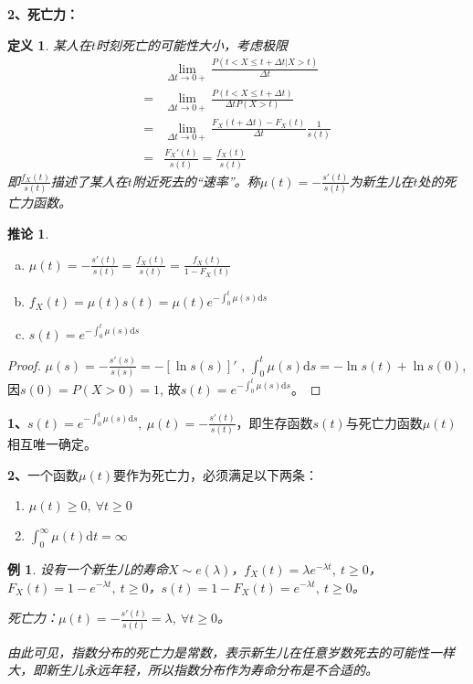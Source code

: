 \documentclass[12pt, a4paper, oneside]{ctexbook}
\newtheorem{definition}[theorem]{定义}
\newtheorem{corollary}[theorem]{推论}
\newtheorem{example}[theorem]{例}
\begin{document}
\textbf{2、死亡力：}
\begin{definition}
    某人在$t$时刻死亡的可能性大小，考虑极限
    \begin{equation*}
        \begin{aligned}
              & \lim_{\Delta t\to0+}\frac{P(t<X\leqslant t+\Delta t|X>t)}{\Delta t}         \\
            = & \lim_{\Delta t\to0+}\frac{P(t<X\leqslant t+\Delta t)}{\Delta tP(X>t)}       \\
            = & \lim_{\Delta t\to0+}\frac{F_X(t+\Delta t) - F_X(t)}{\Delta t}\frac{1}{s(t)} \\
            = & \frac{F_X'(t)}{s(t)} = \frac{f_X(t)}{s(t)}
        \end{aligned}
    \end{equation*}
    即$\frac{f_X(t)}{s(t)}$描述了某人在$t$附近死去的“速率”。称$\mu(t) = - \frac{s'(t)}{s(t)}$为新生儿在$t$处的死亡力函数。
\end{definition}

\begin{corollary}
    \begin{enumerate}[a.]
        \item $\mu(t) = -\frac{s'(t)}{s(t)} = \frac{f_X(t)}{s(t)} = \frac{f_X(t)}{1 - F_X(t)}$
        \item $f_X(t) = \mu(t)s(t) = \mu(t)e^{-\int_0^t \mu(s)\mathrm{d}s}$
        \item $s(t) = e^{-\int_0^t\mu(s)\mathrm{d}s}$
    \end{enumerate}
\end{corollary}

\begin{proof}
    $\mu(s) = -\frac{s'(s)}{s(s)} = -[\ln s(s)]'$
    , $\int_0^t\mu(s)\mathrm{d}s = -\ln s(t) + \ln s(0)$, 因$s(0) = P(X > 0) = 1$, 故$s(t) = e^{-\int_0^t\mu(s)\mathrm{d}s}$。
\end{proof}

\textbf{1、}$s(t) = e^{-\int_{0}^{t}\mu(s)\mathrm{d}s}, ~\mu(t) = -\frac{s'(t)}{s(t)}$，即生存函数$s(t)$与死亡力函数$\mu(t)$相互唯一确定。

\textbf{2、}一个函数$\mu(t)$要作为死亡力，必须满足以下两条：
\begin{enumerate}[(1).]
    \item $\mu(t) \geq 0, ~\forall t \geq 0$
    \item $\int_0^{\infty}\mu(t)\mathrm{d}t = \infty$
\end{enumerate}

\begin{example}
    设有一个新生儿的寿命$X \sim e(\lambda)$，$f_X(t) = \lambda e^{-\lambda t}, ~t \geq 0$，$F_X(t) = 1 - e^{-\lambda t}, ~t \geq 0$，$s(t) = 1- F_X(t) = e^{-\lambda t}, ~t \geq 0$。

    死亡力：$\mu(t) = -\frac{s'(t)}{s(t)} = \lambda, ~\forall t \geq 0$。

    由此可见，指数分布的死亡力是常数，表示新生儿在任意岁数死去的可能性一样大，即新生儿永远年轻，所以指数分布作为寿命分布是不合适的。
\end{example}
\end{document}
